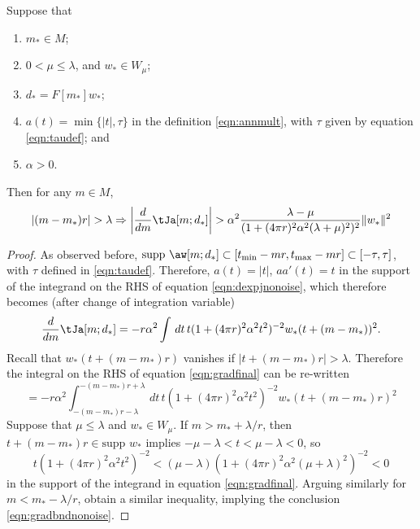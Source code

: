 \begin{proposition}
  \label{thm:rampgood}
  Suppose that
  \begin{enumerate}
  \item $m_* \in M$;
  \item $0 < \mu \le \lambda$, and $w_* \in W_{\mu}$;
  \item $d_* = F[m_*]w_*$;
  \item $a(t)=\min\{|t|,\tau\}$ in the definition \ref{eqn:annmult},
    with $\tau$ given by equation \ref{eqn:taudef}; and
  \item $\alpha > 0$.
  \end{enumerate}
  Then for any $m \in M$, 
  \begin{equation}
    | (m - m_*)r| > \lambda  \Rightarrow  \left|\frac{d}{dm}\tJa[m;d_*]\right| > \alpha^2 
    \frac{\lambda-\mu}{(1+(4\pi r)^2\alpha^2 
      (\lambda+\mu)^2)^{2}} \|w_*\|^2 
    \label{eqn:gradbndnonoise}
  \end{equation}
\end{proposition}
\begin{proof}
  As observed before, $\mbox{supp }\aw[m;d_*] \subset [t_{\rm
    min}-mr,t_{\rm max}-mr]\subset [-\tau,\tau]$, with $\tau$ defined
  in \ref{eqn:taudef}. Therefore, $a(t) = |t|$, $a a'(t) = t$ in the
  support of the integrand on the RHS of equation
  \ref{eqn:dexpjnonoise}, which therefore 
  becomes (after change of integration variable)
  \begin{equation}
    \label{eqn:gradfinal}
    \frac{d}{dm}\tJa[m;d_*] = -r \alpha^2 \int \,dt \, 
  t(1+(4\pi r)^2 \alpha^2 
  t^2)^{-2}w_*(t+(m-m_*))^2.
  \end{equation}
  Recall that $w_*(t+(m-m_*)r)$
  vanishes if $|t+(m-m_*)r| > \lambda$. Therefore the integral on the
  RHS of equation \ref{eqn:gradfinal} can be re-written
  \[
    = -r\alpha^2\int_{-(m-m_*)r-\lambda}^{-(m-m_*)r+\lambda}
    \,dt\, t(1+(4\pi r)^2\alpha^2 t^2)^{-2}w_*\left(t+(m-m_*)r\right)^2
  \]
  Suppose that $\mu \le \lambda$ and $w_* \in W_{\mu}$. 
  If $m > m_*+\lambda/r$, then $t+(m-m_*)r \in \mbox{supp }w_*$
  implies $-\mu - \lambda < t < \mu-\lambda<0$, so 
  \[
    t(1+(4\pi r)^2\alpha^2 t^2)^{-2} < (\mu-\lambda)(1+(4\pi r)^2\alpha^2 (\mu+\lambda)^2)^{-2}<0
  \]
  in the support of the integrand in equation
  \ref{eqn:gradfinal}. Arguing similarly for $m<m_*-\lambda/r$, obtain
  a similar inequality, implying the conclusion \ref{eqn:gradbndnonoise}.
\end{proof}

